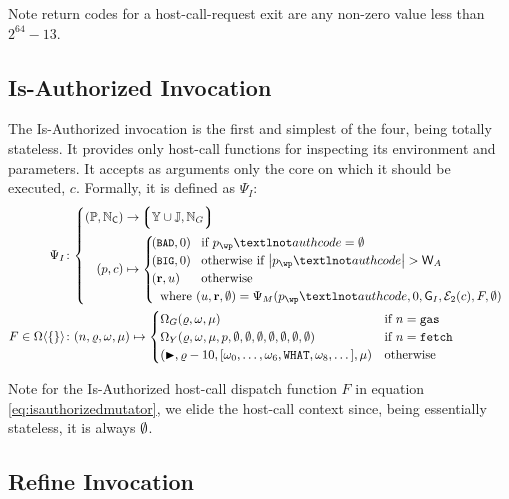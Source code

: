 Note return codes for a host-call-request exit are any non-zero value less than $2^{64} - 13$.

\subsection{Is-Authorized Invocation}\label{sec:isauthorizedinvocation}

The Is-Authorized invocation is the first and simplest of the four, being totally stateless. It provides only host-call functions for inspecting its environment and parameters. It accepts as arguments only the core on which it should be executed, $c$. Formally, it is defined as $\Psi_I$:
\begin{align}
  \Psi_I &\colon \abracegroup{
    (\workpackage, \coreindex) &\to \tuple{\blob \cup \workerror, \gas} \\
    (\wpX, c) &\mapsto \begin{cases}
      \tup{\token{BAD}, 0} &\when \wpX_\wp¬authcode = \none \\
      \tup{\token{BIG}, 0} &\otherwhen \len{\wpX_\wp¬authcode} > \mathsf{W}_A \\
      \tup{\mathbf{r}, u} &\otherwise \\
      \multicolumn{2}{l}{\where (u, \mathbf{r}, \none) = \Psi_M(\wpX_\wp¬authcode, 0, \mathsf{G}_I, \fixedencode{2}{c}, F, \none)}\\
    \end{cases}\\
  } \\
  \label{eq:isauthorizedmutator}F \in \Omega\ang{\emset} &\colon
    (n, \gascounter, \registers, \memory) \mapsto \begin{cases}
      \Omega_G(\gascounter, \registers, \memory) &\when n = \mathtt{gas} \\
      \Omega_Y(\gascounter, \registers, \memory, \wpX, \none, \none, \none, \none, \none, \none, \none) &\when n = \mathtt{fetch} \\
      (\continue, \gascounter - 10, [\registers_0, \dots, \registers_6, \mathtt{WHAT}, \registers_8, \dots], \memory) &\otherwise
    \end{cases}
\end{align}

Note for the Is-Authorized host-call dispatch function $F$ in equation \ref{eq:isauthorizedmutator}, we elide the host-call context since, being essentially stateless, it is always $\emptyset$.

\subsection{Refine Invocation}\label{sec:refineinvocation}


